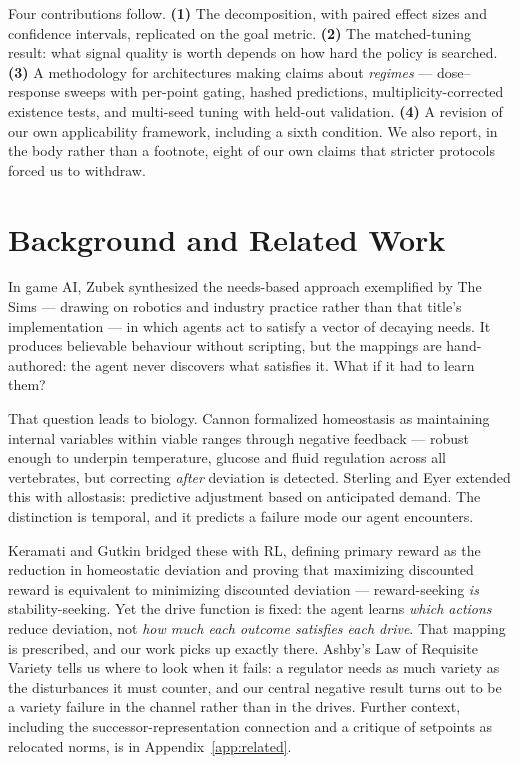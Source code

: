 \documentclass{article}
\begin{document}
Four contributions follow. \textbf{(1)} The decomposition, with paired effect sizes and confidence intervals, replicated on the goal metric. \textbf{(2)} The matched-tuning result: what signal quality is worth depends on how hard the policy is searched. \textbf{(3)} A methodology for architectures making claims about \emph{regimes} --- dose--response sweeps with per-point gating, hashed predictions, multiplicity-corrected existence tests, and multi-seed tuning with held-out validation. \textbf{(4)} A revision of our own applicability framework, including a sixth condition. We also report, in the body rather than a footnote, eight of our own claims that stricter protocols forced us to withdraw.

\section{Background and Related Work}

In game AI, Zubek \cite{ZubekNeedsAI} synthesized the needs-based approach exemplified by The Sims --- drawing on robotics and industry practice rather than that title's implementation --- in which agents act to satisfy a vector of decaying needs. It produces believable behaviour without scripting, but the mappings are hand-authored: the agent never discovers what satisfies it. What if it had to learn them?

That question leads to biology. Cannon \cite{Cannon1932} formalized homeostasis as maintaining internal variables within viable ranges through negative feedback --- robust enough to underpin temperature, glucose and fluid regulation across all vertebrates, but correcting \emph{after} deviation is detected. Sterling and Eyer \cite{SterlingEyer1988} extended this with allostasis: predictive adjustment based on anticipated demand. The distinction is temporal, and it predicts a failure mode our agent encounters.

Keramati and Gutkin \cite{KeramatiGutkin2014} bridged these with RL, defining primary reward as the reduction in homeostatic deviation and proving that maximizing discounted reward is equivalent to minimizing discounted deviation --- reward-seeking \emph{is} stability-seeking. Yet the drive function is fixed: the agent learns \emph{which actions} reduce deviation, not \emph{how much each outcome satisfies each drive}. That mapping is prescribed, and our work picks up exactly there. Ashby's Law of Requisite Variety \cite{Ashby1952} tells us where to look when it fails: a regulator needs as much variety as the disturbances it must counter, and our central negative result turns out to be a variety failure in the channel rather than in the drives. Further context, including the successor-representation connection and a critique of setpoints as relocated norms, is in Appendix~\ref{app:related}.
\end{document}
